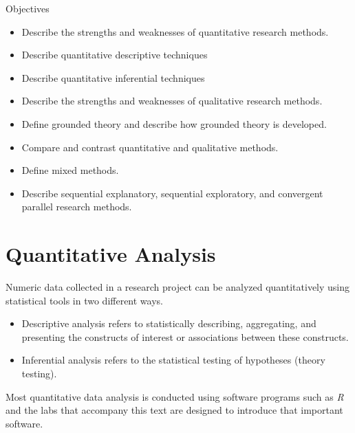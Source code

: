 \begin{center}
	\begin{objbox}{Objectives}
		\begin{itemize}
			\setlength{\itemsep}{0pt}
			\setlength{\parskip}{0pt}
			\setlength{\parsep}{0pt}
			
			\item Describe the strengths and weaknesses of quantitative research methods.
			\item Describe quantitative descriptive techniques
			\item Describe quantitative inferential techniques
			\item Describe the strengths and weaknesses of qualitative research methods.
			\item Define grounded theory and describe how grounded theory is developed.
			\item Compare and contrast quantitative and qualitative methods.
			\item Define mixed methods.
			\item Describe sequential explanatory, sequential exploratory, and convergent parallel research methods.
		\end{itemize}
	\end{objbox}
\end{center}


\section{Quantitative Analysis}

Numeric data collected in a research project can be analyzed quantitatively using statistical tools in two different ways. 

\begin{itemize}

	\item Descriptive analysis refers to statistically describing, aggregating, and presenting the constructs of interest or associations between these constructs. 

	\item Inferential analysis refers to the statistical testing of hypotheses (theory testing). 

\end{itemize}

Most quantitative data analysis is conducted using software programs such as \textit{R} and the labs that accompany this text are designed to introduce that important software.

